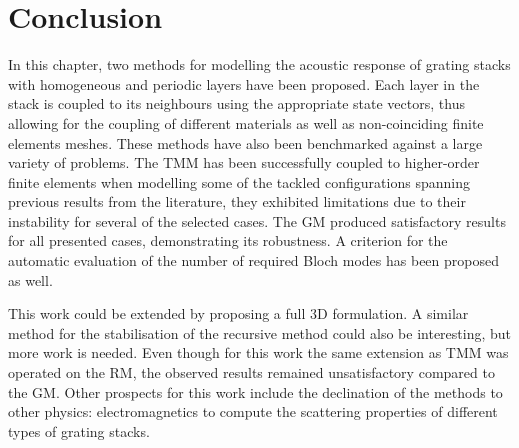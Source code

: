 \section{Conclusion}

In this chapter, two methods for modelling the acoustic response of grating stacks with homogeneous and periodic layers have been proposed. Each layer in the stack is coupled to its neighbours using the appropriate state vectors, thus allowing for the coupling of different materials  as well as non-coinciding finite elements meshes. 
These methods have also been benchmarked against a large variety of problems. The TMM has been successfully coupled to higher-order finite elements when modelling some of the tackled configurations spanning previous results from the literature, they exhibited limitations due to their instability for several of the selected cases. The GM produced satisfactory results for all presented cases, demonstrating its robustness. A criterion for the automatic evaluation of the number of required Bloch modes has been proposed as well. 

This work could be extended by proposing a full 3D formulation. A similar method for the stabilisation of the recursive method could also be interesting, but more work is needed. Even though for this work the same extension as TMM was operated on the RM, the observed results remained unsatisfactory compared to the GM. Other prospects for this work include the declination of the methods to other physics: electromagnetics to compute the scattering properties of different types of grating stacks.